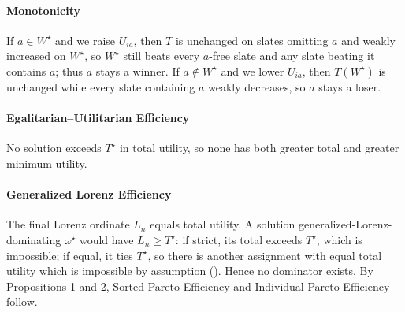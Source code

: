 \documentclass[letterpaper]{article} %
\newcommand{\Pass}{\textcolor{green}{$\checkmark$}}
\begin{document}
\paragraph{Monotonicity} If $a\in W^\star$ and we raise $U_{ia}$, then $T$ is unchanged on slates omitting $a$ and weakly increased on $W^\star$, so $W^\star$ still beats every $a$-free slate and any slate beating it contains $a$; thus $a$ stays a winner.
If $a\notin W^\star$ and we lower $U_{ia}$, then $T(W^\star)$ is unchanged while every slate containing $a$ weakly decreases, so $a$ stays a loser.

\paragraph{Egalitarian--Utilitarian Efficiency} No solution exceeds $T^\star$ in total utility, so none has both greater total and greater minimum utility.

\paragraph{Generalized Lorenz Efficiency} The final Lorenz ordinate $L_n$ equals total utility.
A solution generalized-Lorenz-dominating $\omega^\star$ would have $L_n\ge T^\star$: if strict, its total exceeds $T^\star$, which is impossible; if equal, it ties $T^\star$, so there is another assignment with equal total utility which is impossible by assumption ().
Hence no dominator exists.
By Propositions 1 and 2, Sorted Pareto Efficiency and Individual Pareto Efficiency follow.



\end{document}
